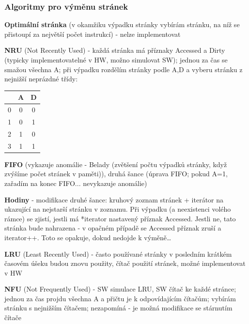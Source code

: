\subsubsection*{Algoritmy pro výměnu stránek}
\begin{pitemize}
	\item \textbf{Optimální stránka} (v okamžiku výpadku stránky vybírám stránku, na níž se přistoupí za největší počet instrukcí) - nelze implementovat
	\item \textbf{NRU} (Not Recently Used) - každá stránka má příznaky Accessed a Dirty (typicky implementovatelné v HW, možno simulovat SW); jednou za čas se smažou všechna A; při výpadku rozdělím stránky podle A,D a vyberu stránku z nejnižší neprázdné třídy:
		\par \begin{center}
		\begin{tabular}{|c|c|c|}
			\hline 
			  & A & D \\
			\hline
			0 & 0 & 0 \\
			\hline
			1 & 0 & 1 \\
			\hline
			2 & 1 & 0 \\
			\hline
			3 & 1 & 1 \\
			\hline
		\end{tabular}
		\end{center}
	\item \textbf{FIFO} (vykazuje anomálie - Belady (zvětšení počtu výpadků stránky, když zvýšíme počet stránek v paměti)), druhá šance (úprava FIFO; pokud A=1, zařadím na konec FIFO... nevykazuje anomálie)
	\item \textbf{Hodiny} - modifikace druhé šance: kruhový zoznam stránek + iterátor na ukazující na nejstarší stránku v zoznamu. Při výpadku (a neexistenci volého rámce) se zjistí, jestli má *iterator nastavený příznak Accessed. Jestli ne, tato stránka bude nahrazena - v opačném případě se Accessed příznak zruší a iterator++. Toto se opakuje, dokud nedojde k výměně\dots
	\item \textbf{LRU} (Least Recently Used) - často používané stránky v posledním krátkém časovém úšeku budou znovu použity, čítač použití stránek, možné implementovat v HW
	\item \textbf{NFU} (Not Frequently Used) - SW simulace LRU, SW čítač ke každé stránce; jednou za čas projdu všechna A a přičtu je k odpovídajícím čítačům; vybírám stránku s nejnižším čítačem; nezapomíná - je možná modifikace se stárnutím čítače
\end{pitemize}

